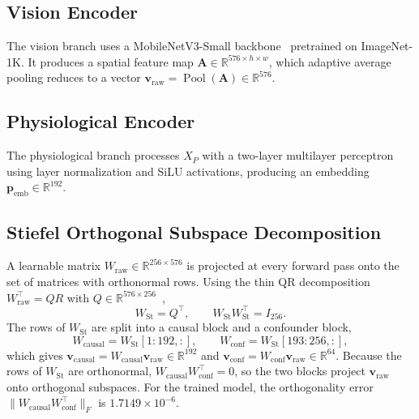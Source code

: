 \subsection{Vision Encoder}
The vision branch uses a MobileNetV3-Small backbone~\cite{howard2019} pretrained on ImageNet-1K. It produces a spatial feature map $\mathbf{A} \in \mathbb{R}^{576 \times h \times w}$, which adaptive average pooling reduces to a vector $\mathbf{v}_{\text{raw}} = \operatorname{Pool}(\mathbf{A}) \in \mathbb{R}^{576}$.

\subsection{Physiological Encoder}
The physiological branch processes $X_P$ with a two-layer multilayer perceptron using layer normalization and SiLU activations, producing an embedding $\mathbf{p}_{\text{emb}} \in \mathbb{R}^{192}$.

\subsection{Stiefel Orthogonal Subspace Decomposition}
A learnable matrix $W_{\text{raw}} \in \mathbb{R}^{256 \times 576}$ is projected at every forward pass onto the set of matrices with orthonormal rows. Using the thin QR decomposition $W_{\text{raw}}^{\top} = QR$ with $Q \in \mathbb{R}^{576 \times 256}$~\cite{edelman1998},
\begin{equation}
W_{\text{St}} = Q^{\top}, \qquad W_{\text{St}} W_{\text{St}}^{\top} = I_{256}.
\end{equation}
The rows of $W_{\text{St}}$ are split into a causal block and a confounder block,
\begin{equation}
W_{\text{causal}} = W_{\text{St}}[1{:}192, :], \qquad W_{\text{conf}} = W_{\text{St}}[193{:}256, :],
\end{equation}
which gives $\mathbf{v}_{\text{causal}} = W_{\text{causal}}\mathbf{v}_{\text{raw}} \in \mathbb{R}^{192}$ and $\mathbf{v}_{\text{conf}} = W_{\text{conf}}\mathbf{v}_{\text{raw}} \in \mathbb{R}^{64}$. Because the rows of $W_{\text{St}}$ are orthonormal, $W_{\text{causal}} W_{\text{conf}}^{\top} = 0$, so the two blocks project $\mathbf{v}_{\text{raw}}$ onto orthogonal subspaces. For the trained model, the orthogonality error $\|W_{\text{causal}} W_{\text{conf}}^{\top}\|_F$ is $1.7149 \times 10^{-6}$.

